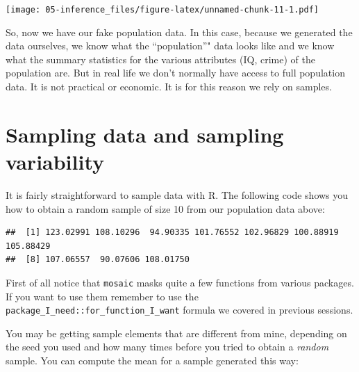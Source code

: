 \documentclass[
]{book}
\newenvironment{Shaded}{\begin{snugshade}}{\end{snugshade}}
\newcommand{\CommentTok}[1]{\textcolor[rgb]{0.56,0.35,0.01}{\textit{#1}}}
\newcommand{\DecValTok}[1]{\textcolor[rgb]{0.00,0.00,0.81}{#1}}
\newcommand{\FunctionTok}[1]{\textcolor[rgb]{0.00,0.00,0.00}{#1}}
\newcommand{\NormalTok}[1]{#1}
\newcommand{\SpecialCharTok}[1]{\textcolor[rgb]{0.00,0.00,0.00}{#1}}
\begin{document}
\texttt{[image: 05-inference\_files/figure-latex/unnamed-chunk-11-1.pdf]}

So, now we have our fake population data. In this case, because we generated the data ourselves, we know what the ``population''" data looks like and we know what the summary statistics for the various attributes (IQ, crime) of the population are. But in real life we don't normally have access to full population data. It is not practical or economic. It is for this reason we rely on samples.

\hypertarget{sampling-data-and-sampling-variability}{%
\section{Sampling data and sampling variability}\label{sampling-data-and-sampling-variability}}

It is fairly straightforward to sample data with R. The following code shows you how to obtain a random sample of size 10 from our population data above:

\begin{Shaded}
\end{Shaded}

\begin{verbatim}
##  [1] 123.02991 108.10296  94.90335 101.76552 102.96829 100.88919 105.88429
##  [8] 107.06557  90.07606 108.01750
\end{verbatim}

First of all notice that \texttt{mosaic} masks quite a few functions from various packages. If you want to use them remember to use the \texttt{package\_I\_need::for\_function\_I\_want} formula we covered in previous sessions.

You may be getting sample elements that are different from mine, depending on the seed you used and how many times before you tried to obtain a \emph{random} sample. You can compute the mean for a sample generated this way:

\begin{Shaded}
\end{Shaded}
\end{document}
